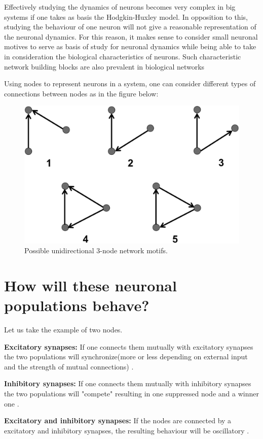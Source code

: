 \documentclass[class={myRUCProject}, crop=false]{standalone}
\begin{document}
\indent Effectively studying the dynamics of neurons becomes very complex in big systems if one takes as basis the Hodgkin-Huxley model. In opposition to this, studying the behaviour of one neuron will not give a reasonable representation of the neuronal dynamics. For this reason, it makes sense to consider small neuronal motives to serve as basis of study for neuronal dynamics while being able to take in consideration the biological characteristics of neurons. Such characteristic network building blocks are also prevalent in biological networks \cite{Sporns2004}

\indent Using nodes to represent neurons in a system, one can consider different types of connections between nodes as in the figure below:


\begin{figure}[h!]
    \centering
    \includegraphics[width=200 pt]{Pictures/Ana/Motif.png}
    \caption{ Possible unidirectional 3-node network motifs. \cite{Shadizadeh2022}}
    \label{fig:enter-label}
\end{figure}

\section{How will these neuronal populations behave?}

Let us take the example of two nodes. \newline

\textbf{Excitatory synapses:} If one connects them mutually with excitatory synapses the two populations will synchronize(more or less depending on external input and the strength of mutual connections) \cite{}.

\textbf{Inhibitory synapses:} If one connects them mutually with inhibitory synapses the two populations will "compete" resulting in one suppressed node and a winner one \cite{}.

\textbf{Excitatory and inhibitory synapses:} If the nodes are connected by a excitatory and inhibitory synapses, the resulting behaviour will be oscillatory \cite{}.
\end{document}
